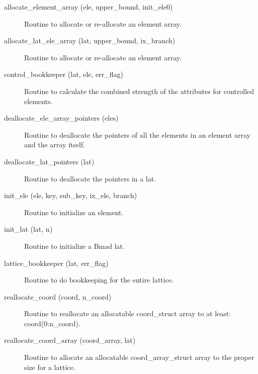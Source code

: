 \begin{description}

\label{r:allocate.element.array}
\item[allocate_element_array (ele, upper_bound, init_ele0)] \Newline 
Routine to allocate or re-allocate an element array.

\label{r:allocate.lat.ele.array}
\item[allocate_lat_ele_array (lat, upper_bound, ix_branch)] \Newline 
Routine to allocate or re-allocate an element array.

\label{r:control.bookkeeper}
\item[control_bookkeeper (lat, ele, err_flag)] \Newline
Routine to calculate the combined strength of the attributes for
controlled elements.

\label{r:deallocate.ele.array.pointers}
\item[deallocate_ele_array_pointers (eles)] \Newline 
Routine to deallocate the pointers of all the elements in an 
element array and the array itself.

\label{r:deallocate.lat.pointers}
\item[deallocate_lat_pointers (lat)] \Newline 
Routine to deallocate the pointers in a lat.

\label{r:init.ele}
\item[init_ele (ele, key, sub_key, ix_ele, branch)] \Newline
Routine to initialize an element. 

\label{r:init.lat}
\item[init_lat (lat, n)] \Newline 
Routine to initialize a Bmad lat.

\label{r:lattice.bookkeeper}
\item[lattice_bookkeeper (lat, err_flag)] \Newline 
Routine to do bookkeeping for the entire lattice.

\label{r:reallocate.coord}
\item[reallocate_coord (coord, n_coord)] \Newline 
Routine to reallocate an allocatable  coord_struct array to at least:
coord(0:n_coord).

\label{r:reallocate.coord.array}
\item[reallocate_coord_array (coord_array, lat)] \Newline 
Routine to allocate an allocatable coord_array_struct array to
the proper size for a lattice.


\end{description}
